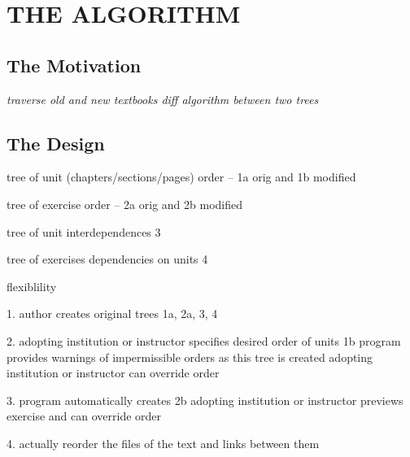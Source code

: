 %
%
%
%


\chapter{THE ALGORITHM}

\section{The Motivation}

\textit{traverse old and new textbooks
diff algorithm between two trees}

\cite{bile}
\cite{tsur}
\cite{react-reconcile}

\section{The Design}

tree of unit (chapters/sections/pages) order -- 1a orig and 1b modified

tree of exercise order -- 2a orig and 2b modified

tree of unit interdependences 3

tree of exercises dependencies on units 4

flexiblility 

1. author creates original trees 1a, 2a, 3, 4

2. adopting institution or instructor specifies desired order of units 1b \newline
   program provides warnings of impermissible orders as this tree is created \newline
   adopting institution or instructor can override order
   
3. program automatically creates 2b \newline
   adopting institution or instructor previews exercise and can override order
   
4. actually reorder the files of the text and links between them

